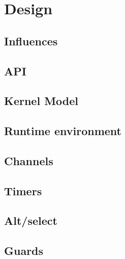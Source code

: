 
\chapter{Design}

\section{Influences}
\section{API}
\section{Kernel Model}
\section{Runtime environment}
\section{Channels}
\section{Timers}
\section{Alt/select}
\section{Guards}

